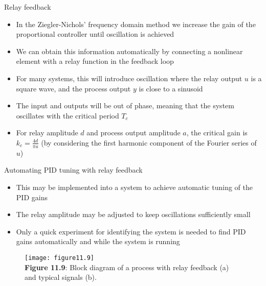 \documentclass{beamer-control}
\begin{document}
\begin{frame}{Relay feedback}
\begin{itemize}
\item In the Ziegler-Nichols' frequency domain method we increase the gain of the proportional controller until oscillation is achieved
\item We can obtain this information automatically by connecting a nonlinear element with a relay function in the feedback loop
\item For many systems, this will introduce oscillation where the relay output $u$ is a square wave, and the process output $y$ is close to a sinusoid
\item The input and outputs will be out of phase, meaning that the system oscillates with the critical period $T_c$
\item For relay amplitude $d$ and process output amplitude $a$, the critical gain is $k_c=\tfrac{4d}{\pi a}$ (by considering the first harmonic component of the Fourier series of $u$)
\end{itemize}
\end{frame}

\begin{frame}{Automating PID tuning with relay feedback}
\begin{itemize}
	\item This may be implemented into a system to achieve automatic tuning of the PID gains 
	\item The relay amplitude may be adjusted to keep oscillations sufficiently small
	\item Only a quick experiment for identifying the system is needed to find PID gains automatically and while the system is running
\end{itemize}
\begin{figure}
	\centering
	\texttt{[image: figure11.9]}
	\\
	\textbf{Figure 11.9}: Block diagram of a process with relay feedback (a) and typical signals (b).
\end{figure}
\end{frame}


\SUMMARYFRAME
\FINALE
\end{document}
